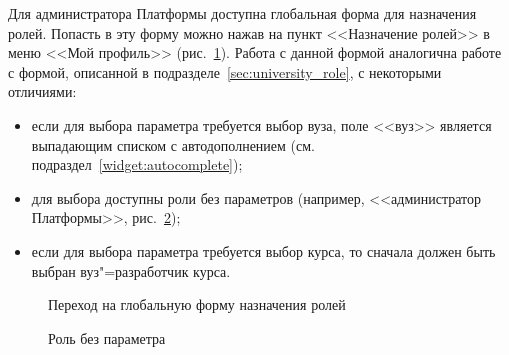 Для администратора Платформы доступна глобальная форма для назначения ролей. Попасть в эту форму можно нажав на пункт <<Назначение ролей>> в
меню <<Мой профиль>> (рис.~\ref{img:employee:global_perms_menu}). Работа с данной формой аналогична работе с формой, описанной в 
подразделе~\ref{sec:university_role}, с некоторыми отличиями:
\begin{itemize}
	\item если для выбора параметра требуется выбор вуза, поле <<вуз>> является выпадающим списком с 
	автодополнением (см. подраздел~\ref{widget:autocomplete});
	\item для выбора доступны роли без параметров (например, <<администратор Платформы>>, рис.~\ref{img:employee:no_param_role});
	\item если для выбора параметра требуется выбор курса, то сначала должен быть выбран вуз"=разработчик курса.
\end{itemize}

\begin{figure}[H]
	\caption{Переход на глобальную форму назначения ролей}
	\label{img:employee:global_perms_menu}
\end{figure}

\begin{figure}[H]
	\caption{Роль без параметра}
	\label{img:employee:no_param_role}
\end{figure}
